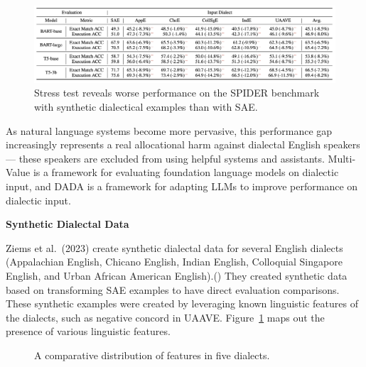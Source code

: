 \documentclass[
  letterpaper,
  numbers=noenddot,
  DIV=11,
  oneside]{scrreprt}
\theoremstyle{remark}
\begin{document}
\begin{figure}[H]

{\centering \includegraphics[width=1\textwidth,height=\textheight]{src/Figures/MV2.png}

}

\caption{Stress test reveals worse performance on the SPIDER benchmark
with synthetic dialectical examples than with SAE.}

\end{figure}%

As natural language systems become more pervasive, this performance gap
increasingly represents a real allocational harm against dialectal
English speakers --- these speakers are excluded from using helpful
systems and assistants. Multi-Value is a framework for evaluating
foundation language models on dialectic input, and DADA is a framework
for adapting LLMs to improve performance on dialectic input.

\textbf{Synthetic Dialectal Data}

Ziems et al.~(2023) create synthetic dialectal data for several English
dialects (Appalachian English, Chicano English, Indian English,
Colloquial Singapore English, and Urban African American
English).() They created synthetic
data based on transforming SAE examples to have direct evaluation
comparisons. These synthetic examples were created by leveraging known
linguistic features of the dialects, such as negative concord in UAAVE.
Figure~\ref{fig-features_dialects} maps out the presence of various
linguistic features.

\begin{figure}


\caption{\label{fig-features_dialects}A comparative distribution of
features in five dialects.}

\end{figure}%
\end{document}
